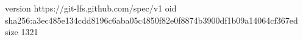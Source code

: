 version https://git-lfs.github.com/spec/v1
oid sha256:a3ec485e134cdd8196c6aba05c4850f82e0f8874b3900df1b09a14064cf367ed
size 1321

